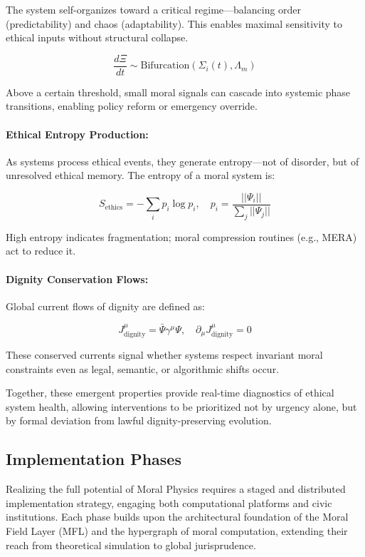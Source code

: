 \documentclass{article}
\theoremstyle{plain}
\theoremstyle{claimstyle}
\begin{document}
The system self-organizes toward a critical regime—balancing order (predictability) and chaos (adaptability). This enables maximal sensitivity to ethical inputs without structural collapse.

\[
\frac{d\Xi}{dt} \sim \text{Bifurcation}(\Sigma_i(t), \Lambda_m)
\]

Above a certain threshold, small moral signals can cascade into systemic phase transitions, enabling policy reform or emergency override.

\paragraph{Ethical Entropy Production:}

As systems process ethical events, they generate entropy—not of disorder, but of unresolved ethical memory. The entropy of a moral system is:

\[
S_{\text{ethics}} = -\sum_i p_i \log p_i, \quad p_i = \frac{||\Psi_i||}{\sum_j ||\Psi_j||}
\]

High entropy indicates fragmentation; moral compression routines (e.g., MERA) act to reduce it.

\paragraph{Dignity Conservation Flows:}

Global current flows of dignity are defined as:

\[
J^\mu_{\text{dignity}} = \bar{\Psi} \gamma^\mu \Psi, \quad \partial_\mu J^\mu_{\text{dignity}} = 0
\]

These conserved currents signal whether systems respect invariant moral constraints even as legal, semantic, or algorithmic shifts occur.

\bigskip

Together, these emergent properties provide real-time diagnostics of ethical system health, allowing interventions to be prioritized not by urgency alone, but by formal deviation from lawful dignity-preserving evolution.

\subsection{Implementation Phases}

Realizing the full potential of Moral Physics requires a staged and distributed implementation strategy, engaging both computational platforms and civic institutions. Each phase builds upon the architectural foundation of the Moral Field Layer (MFL) and the hypergraph of moral computation, extending their reach from theoretical simulation to global jurisprudence.
\end{document}
